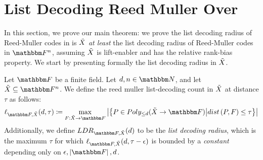\section[List Decoding Reed Muller Over \titlevariety]{List Decoding Reed Muller Over \titlevariety}\label{sec:list-decoding-reed-muller-over-X}
In this section, we prove our main theorem:
we prove the list decoding radius of Reed-Muller codes in is ${\tilde{X}}$ \emph{at least}
the list decoding radius of Reed-Muller codes in $\field$,
assuming ${\tilde{X}}$ is lift-enabler and has the relative rank-bias property.
We start by presenting formally the list decoding radius in ${\tilde{X}}$.
\begin{definition}
    Let $\basefield$ be a finite field.
    Let $\degree, \blocklength \in \naturalnumbersset$, and let $\variety \subseteq \field$.
    \newline
    We define the reed muller list-decoding count in ${\tilde{X}}$ at distance $\tau$ as follows:
    \[
        \listpolycount{\basefield}{\variety}{\degree}{\tau} \definedas
        \max_{\funcdef{\genfunc}{\variety}{\basefield}}
            {\abs{\set{\genpoly \in \allpolyset{\leq \degree}{\variety}{\basefield} \suchthat {\dist{\genpoly, \genfunc} \leq \tau}}}}
    \]
    Additionally, we define $\listdecodingradiusex{\basefield}{\variety}{\degree}$ to be the \emph{list decoding radius}, which is
    the maximum $\tau$ for which $\listpolycount{\basefield}{\variety}{\degree}{\tau - \epsilon}$ is bounded by a \emph{constant} depending only on $\epsilon, \abs{\basefield}, \degree$.
\end{definition}

